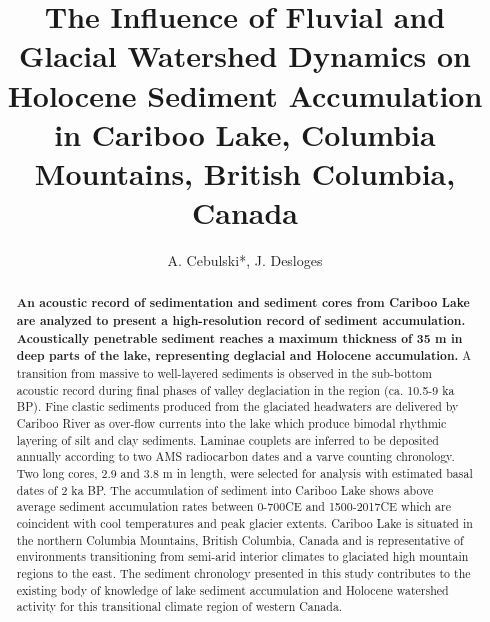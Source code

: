 \documentclass[Royal,times,doublespace,sageh]{sagej}
\begin{document}

\title{The Influence of Fluvial and Glacial Watershed Dynamics on
Holocene Sediment Accumulation in Cariboo Lake, Columbia Mountains,
British Columbia, Canada}


\author{A. Cebulski*, J. Desloges}




\begin{abstract}
\textbf{An acoustic record of sedimentation and sediment cores from
Cariboo Lake are analyzed to present a high-resolution record of
sediment accumulation. Acoustically penetrable sediment reaches a
maximum thickness of 35 m in deep parts of the lake, representing
deglacial and Holocene accumulation.} A transition from massive to
well-layered sediments is observed in the sub-bottom acoustic record
during final phases of valley deglaciation in the region (ca. 10.5-9 ka
BP). Fine clastic sediments produced from the glaciated headwaters are
delivered by Cariboo River as over-flow currents into the lake which
produce bimodal rhythmic layering of silt and clay sediments. Laminae
couplets are inferred to be deposited annually according to two AMS
radiocarbon dates and a varve counting chronology. Two long cores, 2.9
and 3.8 m in length, were selected for analysis with estimated basal
dates of 2 ka BP. The accumulation of sediment into Cariboo Lake shows
above average sediment accumulation rates between 0-700CE and
1500-2017CE which are coincident with cool temperatures and peak glacier
extents. Cariboo Lake is situated in the northern Columbia Mountains,
British Columbia, Canada and is representative of environments
transitioning from semi-arid interior climates to glaciated high
mountain regions to the east. The sediment chronology presented in this
study contributes to the existing body of knowledge of lake sediment
accumulation and Holocene watershed activity for this transitional
climate region of western Canada.
\end{abstract}
\end{document}
